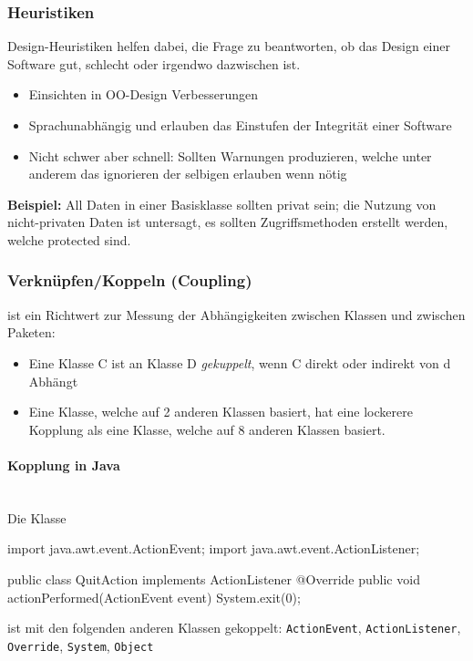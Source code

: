 \documentclass[
    ngerman,
    color=3b,
    summary,
    boxarc,
    main,
]{rubos-tuda-template}
\begin{document}
\subsubsection{Heuristiken}
Design-Heuristiken helfen dabei, die Frage zu beantworten, ob das Design einer Software gut, schlecht oder irgendwo dazwischen ist.
\begin{itemize}
    \item Einsichten in OO-Design Verbesserungen
    \item Sprachunabhängig und erlauben das Einstufen der Integrität einer Software
    \item Nicht schwer aber schnell: Sollten Warnungen produzieren, welche unter anderem das ignorieren der selbigen erlauben wenn nötig
\end{itemize}

\textbf{Beispiel:} All Daten in einer Basisklasse sollten privat sein; die Nutzung von nicht-privaten Daten ist untersagt, es sollten Zugriffsmethoden erstellt werden, welche protected sind.
\clearpage
\subsubsection{Verknüpfen/Koppeln (Coupling)}

\begin{definition}
    ist ein Richtwert zur Messung der Abhängigkeiten zwischen Klassen und zwischen Paketen:
    \begin{itemize}
        \item  Eine Klasse C ist an Klasse D \textit{gekuppelt}, wenn C direkt oder indirekt von d Abhängt
        \item  Eine Klasse, welche auf 2 anderen Klassen basiert, hat eine lockerere Kopplung als eine Klasse, welche auf 8 anderen Klassen basiert.
    \end{itemize}
\end{definition}

\paragraph{Kopplung in Java}\mbox{}\\
Die Klasse
\begin{codeBlock}[autogobble]{}
    import java.awt.event.ActionEvent;
    import java.awt.event.ActionListener;

    public class QuitAction implements ActionListener {
    	@Override
    	public void actionPerformed(ActionEvent event) {
    		System.exit(0);
    	}
    }
\end{codeBlock}
ist mit den folgenden anderen Klassen gekoppelt: \texttt{ActionEvent}, \texttt{ActionListener}, \texttt{Override}, \texttt{System}, \texttt{Object}
\end{document}
